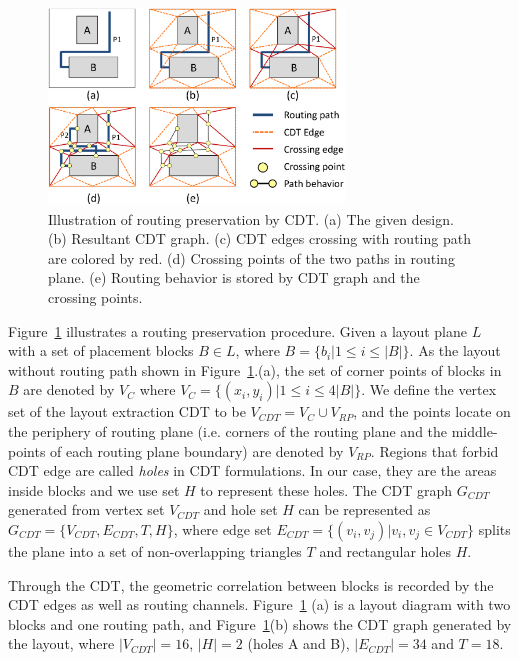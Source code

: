       \begin{figure}[t]
        \begin{center}
        \includegraphics[width=0.7\textwidth]{Fig/Chapter4/CDT.eps}
        \caption{Illustration of routing preservation by CDT. 
          (a) The given design.
          (b) Resultant CDT graph.
          (c) CDT edges crossing with routing path are colored by red.
          (d) Crossing points of the two paths in routing plane.
          (e) Routing behavior is stored by CDT graph and the crossing points.}
        \label{fig:CGC}
        \end{center}
      \end{figure}

      Figure~\ref{fig:CGC} illustrates a routing preservation procedure. Given a layout plane $L$ with a set of placement blocks $B \in L$, where $B = \{b_i|1 \leq i \leq |B|\}$. As the layout without routing path shown in Figure~\ref{fig:CGC}.(a), the set of corner points of blocks in $B$ are denoted by $V_C$ where $V_C = \{(x_i,y_i)|1 \leq i \leq 4|B|\}$. We define the vertex set of the layout extraction CDT to be $V_{CDT} = V_C \cup V_{RP}$, and the points locate on the periphery of routing plane (i.e. corners of the routing plane and the middle-points of each routing plane boundary) are denoted by $V_{RP}$. Regions that forbid CDT edge are called {\it holes} in CDT formulations. In our case, they are the areas inside blocks and we use set $H$ to represent these holes. The CDT graph $G_{CDT}$ generated from vertex set $V_{CDT}$ and hole set $H$ can be represented as $G_{CDT} = \{V_{CDT},E_{CDT},T,H\}$, where edge set $E_{CDT} = \{(v_i,v_j)|v_i,v_j\in V_{CDT}\}$ splits the plane into a set of non-overlapping triangles $T$ and rectangular holes $H$.

      Through the CDT, the geometric correlation between blocks is recorded by the CDT edges as well as routing channels. Figure~\ref{fig:CGC} (a) is a layout diagram with two blocks and one routing path, and Figure~\ref{fig:CGC}(b) shows the CDT graph generated by the layout, where $|V_{CDT}|=16$, $|H|=2$ (holes A and B), $|E_{CDT}|=34$ and $T=18$. 

